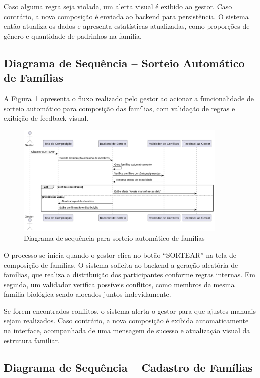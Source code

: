 Caso alguma regra seja violada, um alerta visual é exibido ao gestor. Caso contrário, a nova composição é enviada ao backend para persistência. O sistema então atualiza os dados e apresenta estatísticas atualizadas, como proporções de gênero e quantidade de padrinhos na família.

\subsection{Diagrama de Sequência – Sorteio Automático de Famílias}

A Figura~\ref{fig:familyAutoDraw} apresenta o fluxo realizado pelo gestor ao acionar a funcionalidade de sorteio automático para composição das famílias, com validação de regras e exibição de feedback visual.

\begin{figure}[H]
    \centering
    \includegraphics[width=0.9\textwidth]{images/diagramasdesequencias/familyDraw.png}
    \caption{Diagrama de sequência para sorteio automático de famílias}
    \label{fig:familyAutoDraw}
\end{figure}

O processo se inicia quando o gestor clica no botão “SORTEAR” na tela de composição de famílias. O sistema solicita ao backend a geração aleatória de famílias, que realiza a distribuição dos participantes conforme regras internas. Em seguida, um validador verifica possíveis conflitos, como membros da mesma família biológica sendo alocados juntos indevidamente.

Se forem encontrados conflitos, o sistema alerta o gestor para que ajustes manuais sejam realizados. Caso contrário, a nova composição é exibida automaticamente na interface, acompanhada de uma mensagem de sucesso e atualização visual da estrutura familiar.

\subsection{Diagrama de Sequência – Cadastro de Famílias}

